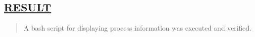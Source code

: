 \documentclass[a4paper, 12pt]{article}
\begin{document}
\begin{figure}[H] 
    \centering
\end{figure}


\subsection*{\underline{RESULT}}
\begin{quote}
A bash script for displaying process information was executed and verified.
\end{quote}
\end{document}
